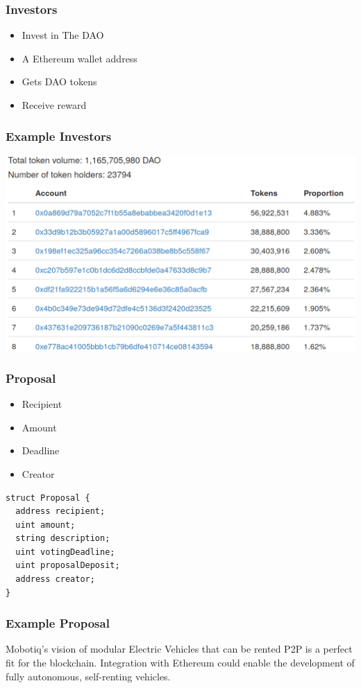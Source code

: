 \documentclass{beamer}
\begin{document}
\begin{frame}
\frametitle{Investors}
\begin{itemize}
  \item Invest in The DAO
  \item A Ethereum wallet address
  \item Gets DAO tokens
  \item Receive reward
\end{itemize}
\end{frame}


\begin{frame}
\frametitle{Example Investors}
\centering
\includegraphics[width=\textwidth,height=0.8\textheight,keepaspectratio]{assets/token_holders.png}
\end{frame}


\begin{frame}[fragile]
\frametitle{Proposal}
\begin{itemize}[<1-2>]
  \item Recipient
  \item Amount
  \item Deadline
  \item Creator
\end{itemize}
\pause
\begin{lstlisting}[language=Solidity]
struct Proposal {
  address recipient;
  uint amount;
  string description;
  uint votingDeadline;
  uint proposalDeposit;
  address creator;
}
\end{lstlisting}
\end{frame}


\begin{frame}
\frametitle{Example Proposal}
Mobotiq's vision of modular Electric Vehicles that can be rented P2P is a perfect fit for the blockchain. Integration with Ethereum could enable the development of fully autonomous, self-renting vehicles.
\end{frame}
\end{document}
